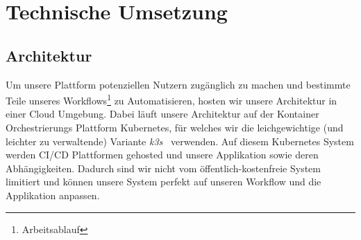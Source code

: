 
\chapter{Technische Umsetzung}


\section{Architektur}
Um unsere Plattform potenziellen Nutzern zugänglich zu machen und bestimmte Teile unseres Workflows\footnote{Arbeitsablauf} zu Automatisieren, hosten wir unsere Architektur in einer Cloud Umgebung.
Dabei läuft unsere Architektur auf der Kontainer Orchestrierungs Plattform Kubernetes, für welches wir die leichgewichtige (und leichter zu verwaltende) Variante \textit{k3s}~\parencite{web/k3s} verwenden.
Auf diesem Kubernetes System werden \ac{CI/CD} Plattformen gehosted und unsere Applikation sowie deren Abhängigkeiten. Dadurch sind wir nicht vom öffentlich-kostenfreie System limitiert und können unsere
System perfekt auf unseren Workflow und die Applikation anpassen.

